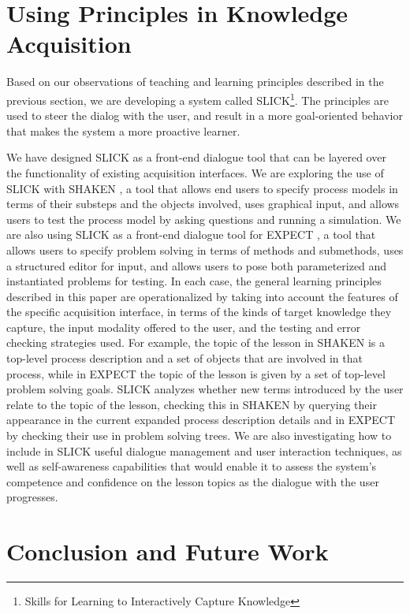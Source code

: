 \documentclass{llncs}
\begin{document}
\section{Using Principles in Knowledge Acquisition}

Based on our observations of teaching and learning principles described in the
previous section, we are developing a system called SLICK\footnote{Skills for
Learning to Interactively Capture Knowledge}.  The principles are
used to steer the dialog with the user, and result in a more
goal-oriented behavior that makes the system a more proactive learner.

We have designed SLICK as a front-end dialogue tool that can be layered over
the functionality of existing acquisition interfaces.  We are exploring the
use of SLICK with SHAKEN \cite{Clark01}, a tool that allows end users to
specify process models in terms of their substeps and the objects involved,
uses graphical input, and allows users to test the process model by asking
questions and running a simulation.  We are also using SLICK as a front-end
dialogue tool for EXPECT \cite{expect01}, a tool that allows users to specify
problem solving in terms of methods and submethods, uses a structured editor
for input, and allows users to pose both parameterized and instantiated
problems for testing.  In each case, the general learning principles described
in this paper are operationalized by taking into account the features of the
specific acquisition interface, in terms of the kinds of target knowledge they
capture, the input modality offered to the user, and the testing and error
checking strategies used.  For example, the topic of the lesson in SHAKEN is a
top-level process description and a set of objects that are involved in that
process, while in EXPECT the topic of the lesson is given by a set of
top-level problem solving goals.  SLICK analyzes whether new terms introduced
by the user relate to the topic of the lesson, checking this in SHAKEN by
querying their appearance in the current expanded process description details
and in EXPECT by checking their use in problem solving trees.  We are also
investigating how to include in SLICK useful dialogue management and user
interaction techniques, as well as self-awareness capabilities that would
enable it to assess the system's competence and confidence on the lesson
topics as the dialogue with the user progresses.


\section{Conclusion and Future Work}
\end{document}
